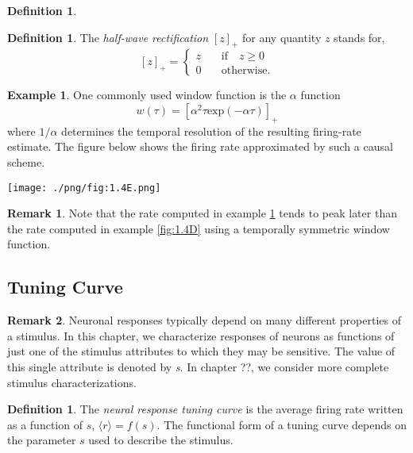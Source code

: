 \documentclass[letterpaper,oneside]{book}
\numberwithin{equation}{chapter}
\theoremstyle{definition}
\newtheorem{defn}[thm]{Definition}
\newtheorem{exm}[thm]{Example}
\newtheorem{rem}{Remark}[chapter]
\begin{document}
\begin{multicols}{2}
\begin{defn}
\end{defn}

\begin{defn}
  The \emph{half-wave rectification} $[z]_+$ for any quantity $z$ stands for,
\begin{equation}
  \label{equ:1.13}
  [z]_+ =\left\{
    \begin{aligned}
      z \quad &\text{if} \quad z\geqslant 0\\
      0 \quad & \text{otherwise}.
    \end{aligned}
  \right.
\end{equation}
\end{defn}

\begin{exm}
  \label{fig:1.4E}
  One commonly used window function is the $\alpha$ function
  \begin{equation}
    w(\tau)=[\alpha^2 \tau \text{exp}(-\alpha\tau) ]_+ 
  \end{equation}
  where $1/\alpha$ determines the temporal resolution of the resulting firing-rate
 estimate. The figure below shows the firing rate approximated by such a causal scheme.
\end{exm}

\begin{center}
  \texttt{[image: ./png/fig:1.4E.png]}
\end{center}

\begin{rem}
  Note that the rate computed in example \ref{fig:1.4E} tends to peak later than the 
  rate computed in example \ref{fig:1.4D} using a temporally symmetric window function.%
\end{rem}

\subsection{Tuning Curve}

\begin{rem}
  Neuronal responses typically depend on many different properties of a
stimulus. In this chapter, we characterize responses of neurons as functions of 
just one of the stimulus attributes to which they may be sensitive. The value of this 
single attribute is denoted by \emph{s}. In chapter ??, we consider
more complete stimulus characterizations.
\end{rem}

\begin{defn}
  The \emph{neural response tuning curve} is the average firing rate written 
  as a function of $s$, $\langle r\rangle =f(s)$. The functional form of a tuning 
  curve depends on the parameter $s$ used to describe the stimulus. 
\end{defn}


\end{multicols}
\end{document}
